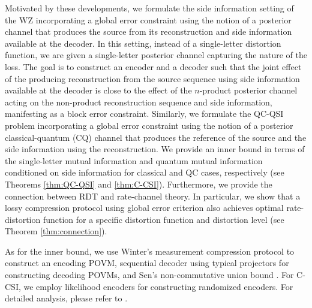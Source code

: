 Motivated by these developments, we formulate the side information setting of the WZ incorporating a global error constraint using the notion of a posterior channel that produces the source from its reconstruction and side information available at the decoder. In this setting, instead of a single-letter distortion function, we are given a single-letter posterior channel capturing the nature of the loss. The goal is to construct an encoder and a decoder such that the joint effect of the producing reconstruction from the source sequence using side information available at the decoder is close to the effect of the $n$-product posterior channel acting on the non-product reconstruction sequence and side information, manifesting as a block error constraint. Similarly, we formulate the QC-QSI problem incorporating a global error constraint using the notion of a posterior classical-quantum (CQ) channel that produces the reference of the source and the side information using the reconstruction. We provide an inner bound in terms of the single-letter mutual information and quantum mutual information conditioned on side information for classical and QC cases, respectively (see Theorems \ref{thm:QC-QSI} and \ref{thm:C-CSI}). Furthermore, we provide the connection between RDT and rate-channel theory. In particular, we show that a lossy compression protocol using global error criterion also achieves optimal rate-distortion function for a specific distortion function and distortion level (see Theorem \ref{thm:connection}).

As for the inner bound, we use Winter's measurement compression protocol \cite{winter1999coding} to construct an encoding POVM, sequential decoder \cite{wilde2013sequential} using typical projectors for constructing decoding POVMs, and Sen's non-commutative union bound \cite{sen2012achieving}. For C-CSI, we employ likelihood encoders \cite{cuff2010coordination, atif2022source} for constructing randomized encoders. For detailed analysis, please refer to \cite{sohail2025WZ}.







